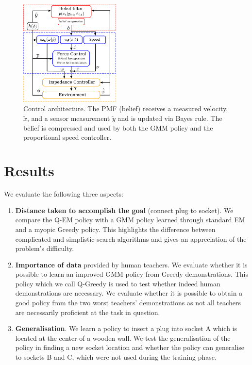 \documentclass[final,3p,times,twocolumn]{elsarticle}
\begin{document}
\begin{figure}
  \centering
  \includegraphics[width=0.45\textwidth]{./Figures/control_flow_final.pdf}
  \caption{Control architecture. The PMF (belief) receives a measured velocity, $\dot{\tilde{x}}$, and 
  a sensor measurement $\tilde{y}$ and is updated via Bayes rule. The belief is compressed and used by 
  both the GMM policy and the proportional speed controller.}
  \label{fig:control_flow}
\end{figure}


\section{Results}\label{sec:results}

We evaluate the following three aspects:
\begin{enumerate}
 \item \textbf{Distance taken to accomplish the goal} (connect plug to socket). We compare the Q-EM policy with 
 a GMM policy learned through standard EM and a myopic Greedy policy. This highlights the difference between complicated and simplistic  
  search algorithms and gives an appreciation of the problem's difficulty.
 \item \textbf{Importance of data} provided by human teachers. We evaluate whether it is possible to learn 
 an improved GMM policy from Greedy demonstrations. This policy which we call Q-Greedy is used to test whether 
 indeed human demonstrations are necessary. We evaluate whether it is possible to obtain a good policy from the two worst teachers' demonstrations as not all teachers 
 are necessarily proficient at the task in question. 
  \item \textbf{Generalisation}. We learn a policy to insert a plug into socket A which is located at the center of a wooden 
 wall. We test the generalisation of the policy in finding a new socket location and whether the policy can generalise to sockets 
 B and C, which were not used during the training phase.
\end{enumerate}
\end{document}
